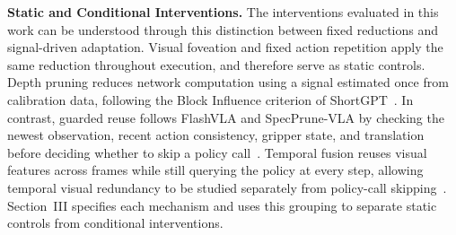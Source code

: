 \documentclass[letterpaper, 10 pt, conference]{ieeeconf}
\begin{document}
\noindent\textbf{Static and Conditional Interventions.}
The interventions evaluated in this work can be understood through this distinction between fixed reductions and signal-driven adaptation. Visual foveation and fixed action repetition apply the same reduction throughout execution, and therefore serve as static controls. Depth pruning reduces network computation using a signal estimated once from calibration data, following the Block Influence criterion of ShortGPT~\cite{shortgpt}. In contrast, guarded reuse follows FlashVLA and SpecPrune-VLA by checking the newest observation, recent action consistency, gripper state, and translation before deciding whether to skip a policy call~\cite{flashvla,specprune}. Temporal fusion reuses visual features across frames while still querying the policy at every step, allowing temporal visual redundancy to be studied separately from policy-call skipping~\cite{ttfvla,vlainfoentropy,vlaiap}. Section~III specifies each mechanism and uses this grouping to separate static controls from conditional interventions.


\end{document}
